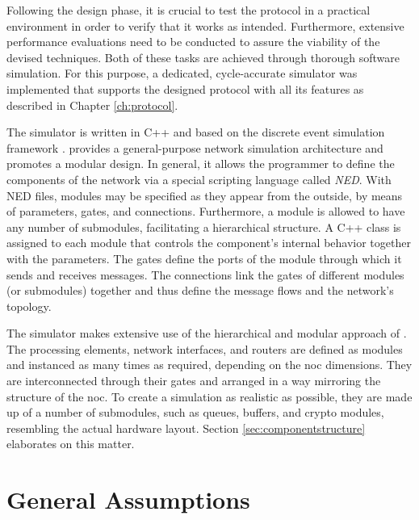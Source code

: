 Following the design phase, it is crucial to test the protocol in a practical environment in order to verify that it works as intended. Furthermore,
extensive performance evaluations need to be conducted to assure the viability of the devised techniques. Both of these tasks are achieved through
thorough software simulation. For this purpose, a dedicated, cycle-accurate simulator was implemented that supports the designed protocol with all its
features as described in Chapter \ref{ch:protocol}.

The simulator is written in C++ and based on the \textit{\omnet} discrete event simulation framework \cite{omnet}. \omnet provides a general-purpose
network simulation architecture and promotes a modular design. In general, it allows the programmer to define the components of the network via a
special scripting language called \textit{NED}. With NED files, modules may be specified as they appear from the outside, by means of parameters,
gates, and connections. Furthermore, a module is allowed to have any number of submodules, facilitating a hierarchical structure. A C++
class is assigned to each module that controls the component's internal behavior together with the parameters. The gates define the ports of the
module through which it sends and receives messages. The connections link the gates of different modules (or submodules) together and thus define the
message flows and the network's topology.

The simulator makes extensive use of the hierarchical and modular approach of \omnet. The processing elements, network interfaces, and routers are
defined as modules and instanced as many times as required, depending on the \gls{noc} dimensions. They are interconnected through their gates and
arranged in a way mirroring the structure of the \gls{noc}. To create a simulation as realistic as possible, they are made up of a number of
submodules, such as queues, buffers, and crypto modules, resembling the actual hardware layout. Section \ref{sec:componentstructure} elaborates on
this matter.

\section{General Assumptions}
